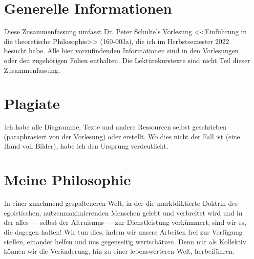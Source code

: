 \documentclass[../main.tex]{subfiles}
\begin{document}
\section{Generelle Informationen}
Diese Zusammenfassung umfasst Dr. Peter Schulte's Vorlesung <<Einführung in die theoretische Philosophie>> (160-003a), die ich im Herbstsemester 2022 besucht habe. Alle hier vorzufindenden Informationen sind in den Vorlesungen oder den zugehörigen Folien enthalten. Die Lektürekurstexte sind nicht Teil dieser Zusammenfassung. 

\section{Plagiate}
Ich habe alle Diagramme, Texte und andere Ressourcen selbst geschrieben (paraphrasiert von der Vorlesung) oder erstellt. Wo dies nicht der Fall ist (eine Hand voll Bilder), habe ich den Ursprung verdeutlicht. 

\section{Meine Philosophie}
In einer zunehmend gespalteneren Welt, in der die marktdiktierte Doktrin des egoistischen, nutzenmaximierenden Menschen gelebt und verbreitet wird und in der alles — selbst der Altruismus — zur Dienstleistung verkümmert, sind wir es, die dagegen halten! Wir tun dies, indem wir unsere Arbeiten frei zur Verfügung stellen, einander helfen und uns gegenseitig wertschätzen. Denn nur als Kollektiv können wir die Veränderung, hin zu einer lebenswerteren Welt, herbeiführen. 
\end{document}
